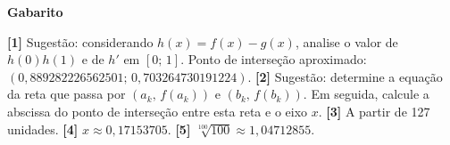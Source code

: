 \documentclass[12pt,a4paper]{article}
\begin{document}
\begin{center}
  \textbf{Gabarito}
\end{center}
  \textbf{[1]} Sugestão: considerando $h(x) = f(x) - g(x)$, analise o valor de 
$h(0)h(1)$ e de $h'$ em $[0;\,1]$. Ponto de interseção aproximado:
$(0,889282226562501;\,0,703264730191224)$. 
  \textbf{[2]} Sugestão: determine a equação da reta que passa por $(a_k,\,f(a_k))$
  e $(b_k,\,f(b_k))$. Em seguida, calcule a abscissa do ponto de interseção entre esta
  reta e o eixo $x$.
  \textbf{[3]} A partir de 127 unidades. 
  \textbf{[4]} $x \approx 0,17153705$. 
  \textbf{[5]} $\sqrt[100]{100} \approx 1,04712855$. 
\end{document}
